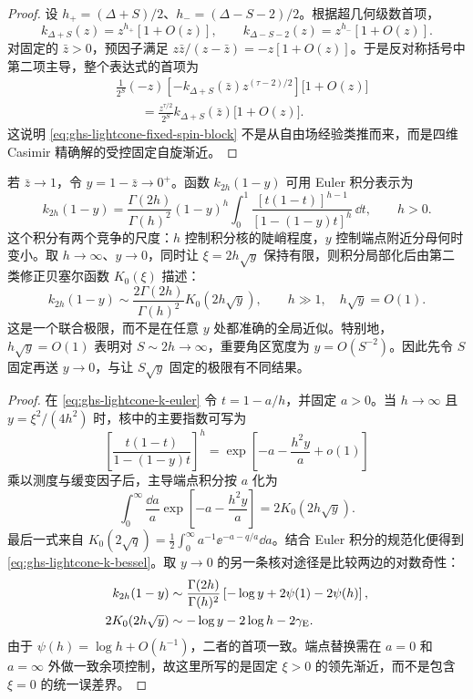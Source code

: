 \begin{proof}
设 $h_+=(\Delta+S)/2$、$h_-=(\Delta-S-2)/2$。根据超几何级数首项，
\begin{equation*}
k_{\Delta+S}(z)=z^{h_+}[1+O(z)],\qquad
k_{\Delta-S-2}(z)=z^{h_-}[1+O(z)].
\end{equation*}
对固定的 $\bar z>0$，预因子满足 $z\bar z/(z-\bar z)=-z[1+O(z)]$。于是反对称括号中第二项主导，整个表达式的首项为
\begin{align*}
&\frac1{2^S}(-z)\left[-k_{\Delta+S}(\bar z)
z^{(\tau-2)/2}\right]\bigl[1+O(z)\bigr]\\
&\qquad=\frac{z^{\tau/2}}{2^S}k_{\Delta+S}(\bar z)
\bigl[1+O(z)\bigr].
\end{align*}
这说明 \cref{eq:ghs-lightcone-fixed-spin-block} 不是从自由场经验类推而来，而是四维 Casimir 精确解的受控固定自旋渐近。
\end{proof}

若 $\bar z\to1$，令 $y=1-\bar z\to0^+$。函数 $k_{2h}(1-y)$ 可用 Euler 积分表示为
\begin{equation}\label{eq:ghs-lightcone-k-euler}
 k_{2h}(1-y)=\frac{\Gamma(2h)}{\Gamma(h)^2}(1-y)^h
 \int_0^1\frac{[t(1-t)]^{h-1}}{[1-(1-y)t]^h}\,\dd t,
 \qquad h>0.
\end{equation}
这个积分有两个竞争的尺度：$h$ 控制积分核的陡峭程度，$y$ 控制端点附近分母何时变小。取 $h\to\infty$、$y\to0$，同时让 $\xi=2h\sqrt y$ 保持有限，则积分局部化后由第二类修正贝塞尔函数 $K_0(\xi)$ 描述：
\begin{equation}\label{eq:ghs-lightcone-k-bessel}
 k_{2h}(1-y)\sim
 \frac{2\Gamma(2h)}{\Gamma(h)^2}K_0(2h\sqrt y),
 \qquad h\gg1,\quad h\sqrt y=O(1).
\end{equation}
这是一个联合极限，而不是在任意 $y$ 处都准确的全局近似。特别地，$h\sqrt y=O(1)$ 表明对 $S\sim2h\to\infty$，重要角区宽度为 $y=O(S^{-2})$。因此先令 $S$ 固定再送 $y\to0$，与让 $S\sqrt y$ 固定的极限有不同结果。


\begin{proof}
在 \cref{eq:ghs-lightcone-k-euler} 令 $t=1-a/h$，并固定 $a>0$。当 $h\to\infty$ 且 $y=\xi^2/(4h^2)$ 时，核中的主要指数可写为
\begin{equation*}
\left[\frac{t(1-t)}{1-(1-y)t}\right]^h
=\exp\left[-a-\frac{h^2y}{a}+o(1)\right]
\end{equation*}
乘以测度与缓变因子后，主导端点积分按 $a$ 化为
\begin{equation*}
\int_0^\infty\frac{\dd a}{a}
\exp\left[-a-\frac{h^2y}{a}\right]
=2K_0(2h\sqrt y).
\end{equation*}
最后一式来自 $K_0(2\sqrt q)=\tfrac12\int_0^\infty a^{-1}\ee^{-a-q/a}\dd a$。结合 Euler 积分的规范化便得到 \cref{eq:ghs-lightcone-k-bessel}。取 $y\to0$ 的另一条核对途径是比较两边的对数奇性：
\begin{align*}
k_{2h}(1-y)&\sim\frac{\Gamma(2h)}{\Gamma(h)^2}
\left[-\log y+2\psi(1)-2\psi(h)\right],\\
2K_0(2h\sqrt y)&\sim-\log y-2\log h-2\gamma_{\rm E}.
\end{align*}
由于 $\psi(h)=\log h+O(h^{-1})$，二者的首项一致。端点替换需在 $a=0$ 和 $a=\infty$ 外做一致余项控制，故这里所写的是固定 $\xi>0$ 的领先渐近，而不是包含 $\xi=0$ 的统一误差界。
\end{proof}

